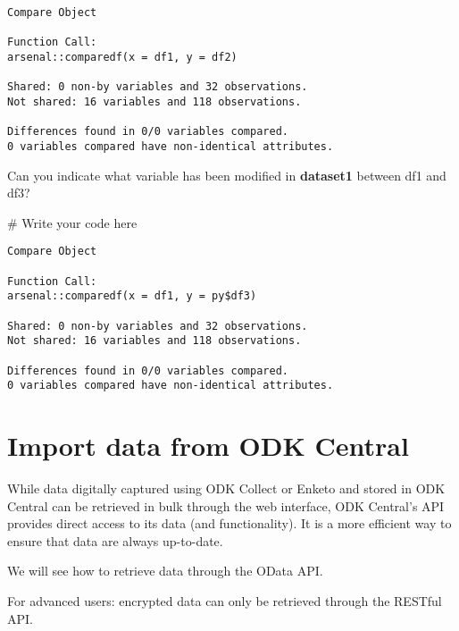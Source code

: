 \documentclass[
  letterpaper,
  DIV=11,
  numbers=noendperiod]{scrartcl}
\newenvironment{Shaded}{\begin{snugshade}}{\end{snugshade}}
\newcommand{\CommentTok}[1]{\textcolor[rgb]{0.37,0.37,0.37}{#1}}
\begin{document}
\begin{verbatim}
Compare Object

Function Call: 
arsenal::comparedf(x = df1, y = df2)

Shared: 0 non-by variables and 32 observations.
Not shared: 16 variables and 118 observations.

Differences found in 0/0 variables compared.
0 variables compared have non-identical attributes.
\end{verbatim}

Can you indicate what variable has been modified in \textbf{dataset1}
between df1 and df3?

\begin{Shaded}
\begin{Highlighting}[]
\CommentTok{\# Write your code here}
\end{Highlighting}
\end{Shaded}

\begin{verbatim}
Compare Object

Function Call: 
arsenal::comparedf(x = df1, y = py$df3)

Shared: 0 non-by variables and 32 observations.
Not shared: 16 variables and 118 observations.

Differences found in 0/0 variables compared.
0 variables compared have non-identical attributes.
\end{verbatim}

\hypertarget{import-data-from-odk-central}{%
\section{Import data from ODK
Central}\label{import-data-from-odk-central}}

While data digitally captured using ODK Collect or Enketo and stored in
ODK Central can be retrieved in bulk through the web interface, ODK
Central's API provides direct access to its data (and functionality). It
is a more efficient way to ensure that data are always up-to-date.

We will see how to retrieve data through the OData API.

\begin{tcolorbox}[enhanced jigsaw, arc=.35mm, coltitle=black, toprule=.15mm, bottomtitle=1mm, colbacktitle=quarto-callout-important-color!10!white, bottomrule=.15mm, titlerule=0mm, rightrule=.15mm, colframe=quarto-callout-important-color-frame, title=\textcolor{quarto-callout-important-color}{\faExclamation}\hspace{0.5em}{Important}, breakable, opacityback=0, opacitybacktitle=0.6, toptitle=1mm, leftrule=.75mm, colback=white, left=2mm]
For advanced users: encrypted data can only be retrieved through the
RESTful API.
\end{tcolorbox}
\end{document}
